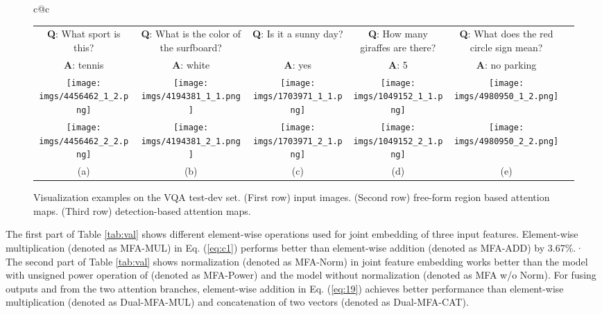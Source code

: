 \documentclass[letterpaper]{article}
\begin{document}
{\begin{figure*}[t!]
\begin{tabular}{c@{\hspace{-2.5mm}}c}
\begin{tabular}{c@{\hspace{2mm}}c@{\hspace{2mm}}c@{\hspace{2mm}}c@{\hspace{2mm}}c@{\hspace{2mm}}c}
			\textbf{Q}: {What sport is this?} & 
			\textbf{Q}: {What is the color of the surfboard?} & 
			\textbf{Q}: {Is it a sunny day?} & 
			\textbf{Q}: {How many giraffes are there?} &
\textbf{Q}: {What does the red circle sign mean?} \\
			\vspace{0.01in}
			\textbf{A}: {\color{ForestGreen} tennis} & 
			\textbf{A}: {\color{ForestGreen} white} & 
			\textbf{A}: {\color{ForestGreen} yes} & 
			\textbf{A}: {\color{ForestGreen} 5} &
			\textbf{A}: {\color{red} no parking} \\ 
			
			\texttt{[image: imgs/4456462\_1\_2.png]}&
			\texttt{[image: imgs/4194381\_1\_1.png]}&
			\texttt{[image: imgs/1703971\_1\_1.png]}&
			\texttt{[image: imgs/1049152\_1\_1.png]}&
			\texttt{[image: imgs/4980950\_1\_2.png]}\\	
			
			\texttt{[image: imgs/4456462\_2\_2.png]}&
			\texttt{[image: imgs/4194381\_2\_1.png]}&
			\texttt{[image: imgs/1703971\_2\_1.png]}&
			\texttt{[image: imgs/1049152\_2\_1.png]}&
			\texttt{[image: imgs/4980950\_2\_2.png]}\\
			
			{\normalsize(a) } & {\normalsize(b) } & {\normalsize(c)} & {\normalsize(d) }  & {\normalsize(e) }
		\end{tabular}
	\end{tabular}
	\caption{Visualization examples on the VQA test-dev set. (First row) input images. (Second row) free-form region based attention maps. (Third row) detection-based attention maps.}
	\label{fig:vis}
\end{figure*}




The first part of Table \ref{tab:val} shows different element-wise operations used for joint embedding of three input features. Element-wise multiplication (denoted as MFA-MUL) in Eq. (\ref{eq:c1}) performs better than element-wise addition (denoted as MFA-ADD) by 3.67\%.· The second part of Table \ref{tab:val} shows  normalization (denoted as MFA-Norm) in joint feature embedding works better than the model with unsigned power operation of  (denoted as MFA-Power) and the model without normalization (denoted as MFA w/o Norm). For fusing outputs  and  from the two attention branches, element-wise addition in Eq. (\ref{eq:19}) achieves better performance than element-wise multiplication (denoted as Dual-MFA-MUL) and concatenation of two vectors (denoted as Dual-MFA-CAT).


}
\end{document}
